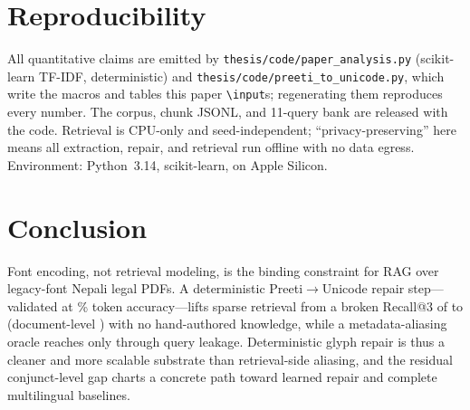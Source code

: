 \documentclass[conference]{IEEEtran}
\begin{document}
\section{Reproducibility}
All quantitative claims are emitted by \texttt{thesis/code/paper\_analysis.py} (scikit-learn TF-IDF, deterministic) and \texttt{thesis/code/preeti\_to\_unicode.py}, which write the macros and tables this paper \texttt{\textbackslash input}s; regenerating them reproduces every number. The corpus, chunk JSONL, and 11-query bank are released with the code. Retrieval is CPU-only and seed-independent; ``privacy-preserving'' here means all extraction, repair, and retrieval run offline with no data egress. Environment: Python~3.14, scikit-learn, on Apple Silicon.

\section{Conclusion}
Font encoding, not retrieval modeling, is the binding constraint for RAG over legacy-font Nepali legal PDFs. A deterministic Preeti$\rightarrow$Unicode repair step---validated at \repairValidity{}\% token accuracy---lifts sparse retrieval from a broken Recall@3 of \rawRecall{} to \repRecall{} (document-level \repDocRecall{}) with no hand-authored knowledge, while a metadata-aliasing oracle reaches \aliRecall{} only through query leakage. Deterministic glyph repair is thus a cleaner and more scalable substrate than retrieval-side aliasing, and the residual conjunct-level gap charts a concrete path toward learned repair and complete multilingual baselines.
\end{document}
